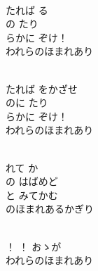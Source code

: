 \documentclass[10pt,b5j]{tarticle} %
\begin{document}
\vspace{1.5em} %
\newcommand{\linespace}{0.5em} %
\newcommand{\blocksize}{0.5\hsize} %
\newcommand{\itemmargin}{3em} %
\begin{enumerate} %
    \setlength{\itemindent}{\itemmargin} %
    \begin{minipage}[c]{\blocksize}
    
        \vspace{\linespace}
        \item~\\
        たれば る\\
        の たり\\
        らかに ぞけ！\\
        われらのほまれあり
        
    \end{minipage}
    \begin{minipage}[c]{\blocksize}
        
        \vspace{\linespace}
        \item~\\
        たれば をかざせ\\
        のに たり\\
        らかに ぞけ！\\
        われらのほまれあり
        
    \end{minipage}
    \begin{minipage}[c]{\blocksize}
        
        \vspace{\linespace}
        \item~\\
        れて か\\
        の はばめど\\
        と みてかむ\\
        のほまれあるかぎり
        
    \end{minipage}
    \begin{minipage}[c]{\blocksize}
        
        \vspace{\linespace}
        \item~\\
        ！ ！ おゝが\\
        われらのほまれあり
    
    \end{minipage}
\end{enumerate} %
\end{document}
